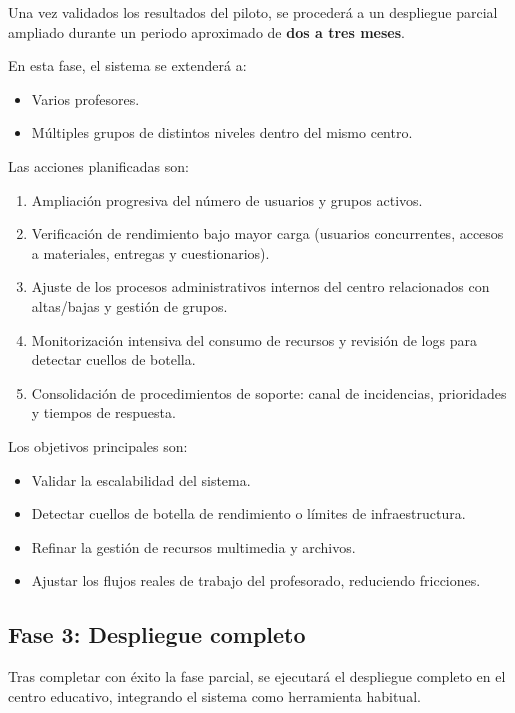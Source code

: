 Una vez validados los resultados del piloto, se procederá a un despliegue parcial ampliado durante un periodo aproximado de \textbf{dos a tres meses}.

En esta fase, el sistema se extenderá a:

\begin{itemize}
    \item Varios profesores.
    \item Múltiples grupos de distintos niveles dentro del mismo centro.
\end{itemize}

Las acciones planificadas son:

\begin{enumerate}
    \item Ampliación progresiva del número de usuarios y grupos activos.
    \item Verificación de rendimiento bajo mayor carga (usuarios concurrentes, accesos a materiales, entregas y cuestionarios).
    \item Ajuste de los procesos administrativos internos del centro relacionados con altas/bajas y gestión de grupos.
    \item Monitorización intensiva del consumo de recursos y revisión de logs para detectar cuellos de botella.
    \item Consolidación de procedimientos de soporte: canal de incidencias, prioridades y tiempos de respuesta.
\end{enumerate}

Los objetivos principales son:

\begin{itemize}
    \item Validar la escalabilidad del sistema.
    \item Detectar cuellos de botella de rendimiento o límites de infraestructura.
    \item Refinar la gestión de recursos multimedia y archivos.
    \item Ajustar los flujos reales de trabajo del profesorado, reduciendo fricciones.
\end{itemize}

\subsection{Fase 3: Despliegue completo}

Tras completar con éxito la fase parcial, se ejecutará el despliegue completo en el centro educativo, integrando el sistema como herramienta habitual.

